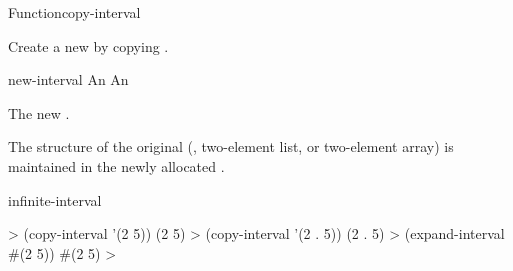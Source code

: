 \documentclass[10pt,twoside,english,pdftex]{article}
\begin{document}
\begin{functiondoc}{Function}{copy-interval}%
  {
    \returns{} }
%
%

\fnsyntax

\fnpurpose Create a new  by copying .

\fnpackage {}

\fnmodule {}

\fnargs
\begin{args}{new-interval}
\arg[interval] An 
 An 
\end{args}

\fnreturns The new .

\fndescription The structure of the original  (,
two-element list, or two-element array) is maintained in the newly allocated
.

\begin{alsos}{infinite-interval}
\end{alsos}

\fnexamples
%
\W\supp
\begin{example}
  > (copy-interval '(2 5))
  (2 5)
  > (copy-interval '(2 . 5))
  (2 . 5)
  > (expand-interval #(2 5))
  #(2 5)
  >
\end{example}

\end{functiondoc}

\end{document}
